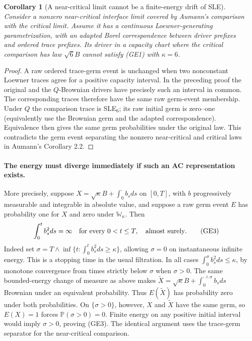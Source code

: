 \documentclass[11pt]{article}
\newtheorem{corollary}[theorem]{Corollary}
\theoremstyle{definition}\newtheorem{definition}[theorem]{Definition}
\theoremstyle{remark}\newtheorem{remark}[theorem]{Remark}
\begin{document}
\begin{corollary}[A near-critical limit cannot be a finite-energy drift of SLE]
\label{cor:nearcritical-energy}
Consider a nonzero near-critical interface limit covered by Aumann's
comparison with the critical limit. Assume it has a continuous
Loewner-generating parametrization, with an adapted Borel correspondence
between driver prefixes and ordered trace prefixes. Its driver in a
capacity chart where the critical comparison has law $\sqrt6 B$ cannot
satisfy (GE1) with $\kappa=6$.
\end{corollary}
\begin{proof}
A raw ordered trace-germ event is unchanged when two nonconstant
Loewner traces agree for a positive capacity interval. In the preceding
proof the original and the $Q$-Brownian drivers have precisely such an
interval in common. The corresponding traces therefore have the same
raw germ-event membership. Under $Q$ the comparison trace is SLE$_6$;
its raw initial germ is zero--one (equivalently use the Brownian germ
and the adapted correspondence). Equivalence then gives the same germ
probabilities under the original law. This contradicts the germ event
separating the nonzero near-critical and critical laws in
Aumann's Corollary 2.2.
\end{proof}

\paragraph{The energy must diverge immediately if such an AC representation exists.}
More precisely, suppose $X=\sqrt\kappa B+\int_0^\cdot b_sds$ on
$[0,T]$, with $b$ progressively measurable and integrable in absolute
value, and suppose a raw germ event $E$ has probability one for $X$
and zero under $\mathbb W_\kappa$. Then
\[
 \int_0^t b_s^2ds=\infty\quad\hbox{for every }0<t\le T,
       \quad\hbox{almost surely}.
 \tag{GE3}
\]
Indeed set $\sigma=T\wedge\inf\{t:\int_0^t b_s^2ds\ge\kappa\}$,
allowing $\sigma=0$ on instantaneous infinite energy. This is a stopping
time in the usual filtration. In all cases
$\int_0^\sigma b_s^2ds\le\kappa$, by monotone convergence from times
strictly below $\sigma$ when $\sigma>0$. The same bounded-energy
change of measure as above makes
$\widetilde X=\sqrt\kappa B+\int_0^{\cdot\wedge\sigma}b_sds$
Brownian under an equivalent probability. Thus $E(\widetilde X)$
has probability zero under both probabilities. On $\{\sigma>0\}$,
however, $X$ and $\widetilde X$ have the same germ, so $E(X)=1$
forces $\mathbb P(\sigma>0)=0$. Finite energy on any positive initial
interval would imply $\sigma>0$, proving (GE3). The identical argument
uses the trace-germ separator for the near-critical comparison.
\end{document}
